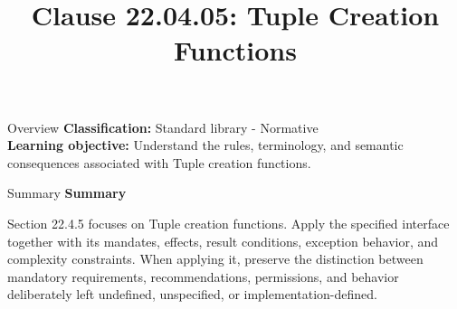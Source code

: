 \documentclass[10pt,letterpaper]{article}
\title{Clause 22.04.05: Tuple Creation Functions}
\author{}
\date{}
\begin{document}
\maketitle
\begin{CornellOverviewBox}{Overview}
\textbf{Classification:} Standard library - Normative\\[2pt]
\textbf{Learning objective:} Understand the rules, terminology, and semantic consequences associated with Tuple creation functions.
\end{CornellOverviewBox}\begin{CornellSummaryBox}{Summary}
{\sffamily\bfseries\color{Accent} Summary}\par\vspace{3pt}Section 22.4.5 focuses on Tuple creation functions. Apply the specified interface together with its mandates, effects, result conditions, exception behavior, and complexity constraints. When applying it, preserve the distinction between mandatory requirements, recommendations, permissions, and behavior deliberately left undefined, unspecified, or implementation-defined.
\end{CornellSummaryBox}
\end{document}
